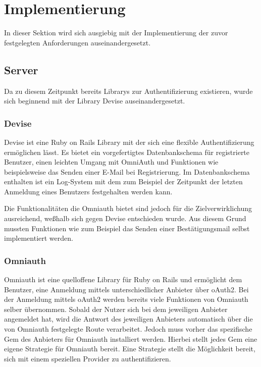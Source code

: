 \section{Implementierung}
\label{sec: implementation}
In dieser Sektion wird sich ausgiebig mit der Implementierung der zuvor festgelegten Anforderungen auseinandergesetzt.

\subsection{Server}
\label{sec: server}
Da zu diesem Zeitpunkt bereits Librarys zur Authentifizierung existieren, wurde sich beginnend mit der Library Devise auseinandergesetzt.

\subsubsection{Devise}
\label{sec: devise}
Devise ist eine Ruby on Rails Library mit der sich eine flexible Authentifizierung ermöglichen lässt. Es bietet ein vorgefertigtes Datenbankschema für registrierte Benutzer, einen leichten Umgang mit OmniAuth und Funktionen wie beispielsweise das Senden einer E-Mail bei Registrierung. Im Datenbankschema enthalten ist ein Log-System mit dem zum Beispiel der Zeitpunkt der letzten Anmeldung eines Benutzers festgehalten werden kann. 

Die Funktionalitäten die Omniauth bietet sind jedoch für die Zielverwirklichung ausreichend, we{\ss}halb sich gegen Devise entschieden wurde. Aus diesem Grund mussten Funktionen wie zum Beispiel das Senden einer Bestätigungsmail selbst implementiert werden. 

\subsubsection{Omniauth}
\label{sec:omniauth}
Omniauth ist eine quelloffene Library für Ruby on Rails und ermöglicht dem Benutzer, eine Anmeldung mittels unterschiedlicher Anbieter über \gls{oAuth2}. Bei der Anmeldung mittels oAuth2 werden bereits viele Funktionen von Omniauth selber übernommen. Sobald der Nutzer sich bei dem jeweiligen Anbieter angemeldet hat, wird die Antwort des jeweiligen Anbieters automatisch über die von Omniauth festgelegte Route verarbeitet. Jedoch muss vorher das spezifische Gem des Anbieters für Omniauth installiert werden. Hierbei stellt jedes Gem eine eigene Strategie für Omniauth bereit. Eine Strategie stellt die Möglichkeit bereit, sich mit einem speziellen Provider zu authentifizieren.

